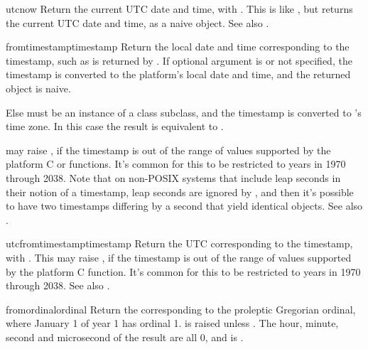 \begin{methoddesc}{utcnow}{}
  Return the current UTC date and time, with  .
  This is like , but returns the current UTC date and time,
  as a naive  object.
  See also .
\end{methoddesc}

\begin{methoddesc}{fromtimestamp}{timestamp}
  Return the local date and time corresponding to the \POSIX{}
  timestamp, such as is returned by .
  If optional argument  is  or not specified, the
  timestamp is converted to the platform's local date and time, and
  the returned  object is naive.

  Else  must be an instance of a class  subclass,
  and the timestamp is converted to 's time zone.  In this case
  the result is equivalent to
  .

   may raise , if the
  timestamp is out of the range of values supported by the platform C
   or  functions.  It's common
  for this to be restricted to years in 1970 through 2038.
  Note that on non-POSIX systems that include leap seconds in their
  notion of a timestamp, leap seconds are ignored by
  , and then it's possible to have two timestamps
  differing by a second that yield identical  objects.
  See also .
\end{methoddesc}

\begin{methoddesc}{utcfromtimestamp}{timestamp}
  Return the UTC  corresponding to the \POSIX{}
  timestamp, with  .
  This may raise , if the
  timestamp is out of the range of values supported by the platform
  C  function.  It's common for this to be
  restricted to years in 1970 through 2038.
  See also .
\end{methoddesc}

\begin{methoddesc}{fromordinal}{ordinal}
  Return the  corresponding to the proleptic
  Gregorian ordinal, where January 1 of year 1 has ordinal 1.
   is raised unless .  The hour, minute, second and
  microsecond of the result are all 0,
  and  is .
\end{methoddesc}

